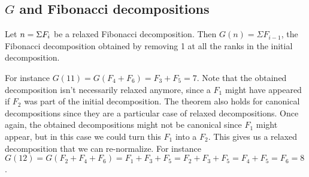 \documentclass[a4paper,11pt]{article}
\begin{document}
\subsection{$G$ and Fibonacci decompositions}

\begin{theorem}\label{Gshift}
Let $n = \Sigma F_i$ be a relaxed Fibonacci decomposition.
Then $G(n) = \Sigma F_{i-1}$, the Fibonacci decomposition obtained
by removing 1 at all the ranks in the initial decomposition.
\end{theorem}

For instance $G(11) = G(F_4+F_6) = F_3 + F_5 = 7$. Note that the
obtained decomposition isn't necessarily relaxed anymore, since a
$F_1$ might have appeared if $F_2$ was part of the initial
decomposition. The theorem also holds for canonical decompositions
since they are a particular case of relaxed decompositions. Once again,
the obtained decompositions might not be canonical since $F_1$ might
appear, but in this case we could turn this $F_1$ into a $F_2$. This
gives us a relaxed decomposition that we can re-normalize. For
instance $G(12) = G(F_2+F_4+F_6) = F_1+F_3+F_5 = F_2+F_3+F_5 = F_4+F_5
= F_6 = 8$.
 
\end{document}
